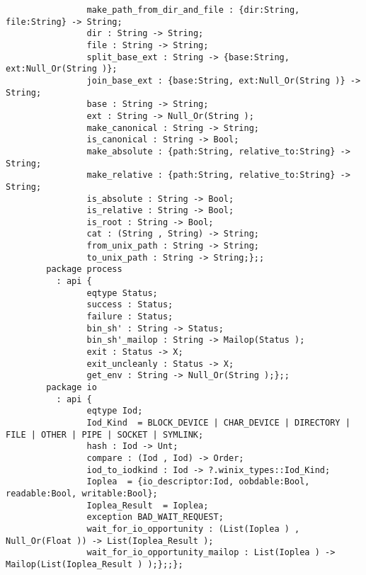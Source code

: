\begin{verbatim}
                make_path_from_dir_and_file : {dir:String, file:String} -> String;
                dir : String -> String;
                file : String -> String;
                split_base_ext : String -> {base:String, ext:Null_Or(String )};
                join_base_ext : {base:String, ext:Null_Or(String )} -> String;
                base : String -> String;
                ext : String -> Null_Or(String );
                make_canonical : String -> String;
                is_canonical : String -> Bool;
                make_absolute : {path:String, relative_to:String} -> String;
                make_relative : {path:String, relative_to:String} -> String;
                is_absolute : String -> Bool;
                is_relative : String -> Bool;
                is_root : String -> Bool;
                cat : (String , String) -> String;
                from_unix_path : String -> String;
                to_unix_path : String -> String;};;
        package process
          : api {
                eqtype Status;
                success : Status;
                failure : Status;
                bin_sh' : String -> Status;
                bin_sh'_mailop : String -> Mailop(Status );
                exit : Status -> X;
                exit_uncleanly : Status -> X;
                get_env : String -> Null_Or(String );};;
        package io
          : api {
                eqtype Iod;
                Iod_Kind  = BLOCK_DEVICE | CHAR_DEVICE | DIRECTORY | FILE | OTHER | PIPE | SOCKET | SYMLINK;
                hash : Iod -> Unt;
                compare : (Iod , Iod) -> Order;
                iod_to_iodkind : Iod -> ?.winix_types::Iod_Kind;
                Ioplea  = {io_descriptor:Iod, oobdable:Bool, readable:Bool, writable:Bool};
                Ioplea_Result  = Ioplea;
                exception BAD_WAIT_REQUEST;
                wait_for_io_opportunity : (List(Ioplea ) , Null_Or(Float )) -> List(Ioplea_Result );
                wait_for_io_opportunity_mailop : List(Ioplea ) -> Mailop(List(Ioplea_Result ) );};;};
\end{verbatim}
